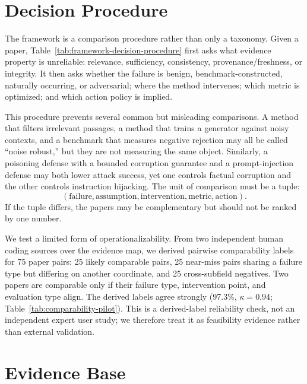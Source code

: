 \documentclass[11pt]{article}
\begin{document}
\section{Decision Procedure}
\label{sec:framework-first}



The framework is a comparison procedure rather than only a taxonomy. Given a paper, Table~\ref{tab:framework-decision-procedure} first asks what evidence property is unreliable: relevance, sufficiency, consistency, provenance/freshness, or integrity. It then asks whether the failure is benign, benchmark-constructed, naturally occurring, or adversarial; where the method intervenes; which metric is optimized; and which action policy is implied.

This procedure prevents several common but misleading comparisons. A method that filters irrelevant passages, a method that trains a generator against noisy contexts, and a benchmark that measures negative rejection may all be called ``noise robust,'' but they are not measuring the same object. Similarly, a poisoning defense with a bounded corruption guarantee and a prompt-injection defense may both lower attack success, yet one controls factual corruption and the other controls instruction hijacking. The unit of comparison must be a tuple:
\[
(\text{failure}, \text{assumption}, \text{intervention}, \text{metric}, \text{action}).
\]
If the tuple differs, the papers may be complementary but should not be ranked by one number.




We test a limited form of operationalizability. From two independent human coding sources over the evidence map, we derived pairwise comparability labels for 75 paper pairs: 25 likely comparable pairs, 25 near-miss pairs sharing a failure type but differing on another coordinate, and 25 cross-subfield negatives. Two papers are comparable only if their failure type, intervention point, and evaluation type align. The derived labels agree strongly (97.3\%, $\kappa=0.94$; Table~\ref{tab:comparability-pilot}). This is a derived-label reliability check, not an independent expert user study; we therefore treat it as feasibility evidence rather than external validation.

\section{Evidence Base}
\label{sec:protocol}
\end{document}
